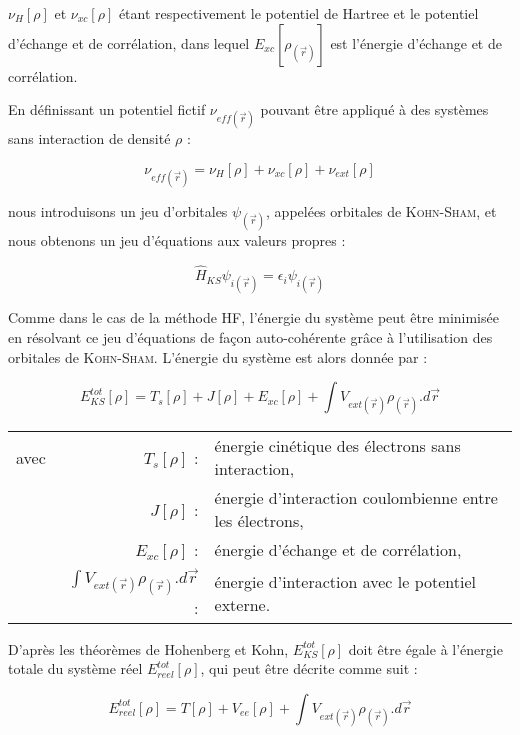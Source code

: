 	\noindent $\nu_{H}[\rho]$ et $\nu_{xc}[\rho]$ étant respectivement le potentiel de Hartree et le potentiel d'échange et de corrélation, dans lequel $E_{xc}[\rho_{(\vec{r})}]$ est l'énergie d'échange et de corrélation.
	
	En définissant un potentiel fictif $\nu_{eff(\vec{r})}$ pouvant être appliqué à des systèmes sans interaction de densité $\rho$ :
	
	\begin{equation}
	\nu_{eff(\vec{r})} = \nu_{H}[\rho] + \nu_{xc}[\rho] + \nu_{ext}[\rho]
	\end{equation}
	
	\noindent nous introduisons un jeu d'orbitales $\psi_{(\vec{r})}$, appelées orbitales de \textsc{Kohn-Sham}, et nous obtenons un jeu d'équations aux valeurs propres :
	
	\begin{equation}
	\hat{H}_{KS} \psi_{i(\vec{r})} = \epsilon_{i} \psi_{i(\vec{r})}
	\end{equation}
	
	Comme dans le cas de la méthode HF, l'énergie du système peut être minimisée en résolvant ce jeu d'équations de façon auto-cohérente grâce à l'utilisation des orbitales de \textsc{Kohn-Sham}. L'énergie du système est alors donnée par :
	
	\begin{equation}
	E_{KS}^{tot}[\rho] = T_{s}[\rho] + J[\rho] + E_{xc}[\rho] + \int V_{ext(\vec{r})}\rho_{(\vec{r})} .d\vec{r}
	\end{equation}
	
	\begin{flushleft}
		\begin{tabular}{@{}lrp{10cm}}
			avec & $T_{s}[\rho]$ : & énergie cinétique des électrons sans interaction, \\
			& $J[\rho]$ : & énergie d'interaction coulombienne entre les électrons, \\
			& $E_{xc}[\rho]$ : & énergie d'échange et de corrélation, \\
			& $\int V_{ext(\vec{r})}\rho_{(\vec{r})} .d\vec{r}$ : & énergie d'interaction avec le potentiel externe. 
		\end{tabular}
	\end{flushleft}
	
	D'après les théorèmes de Hohenberg et Kohn, $E_{KS}^{tot}[\rho]$ doit être égale à l'énergie totale du système réel $E_{reel}^{tot}[\rho]$, qui peut être décrite comme suit :
	
	\begin{equation}
	E_{reel}^{tot}[\rho] = T[\rho] + V_{ee}[\rho] + \int V_{ext(\vec{r})}\rho_{(\vec{r})} .d\vec{r}
	\end{equation}
	
